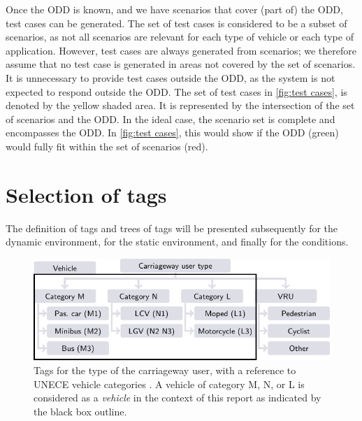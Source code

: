 \documentclass[twoside,twocolumn,9pt]{extarticle}
\theoremstyle{plain}
\begin{document}

Once the ODD is known, and we have scenarios that cover (part of) the ODD, test cases can be generated. The set of test cases is considered to be a subset of scenarios, as not all scenarios are relevant for each type of vehicle or each type of application. However, test cases are always generated from scenarios; we therefore assume that no test case is generated in areas not covered by the set of scenarios. It is unnecessary to provide test cases outside the ODD, as the system is not expected to respond outside the ODD. The set of test cases in \cref{fig:test cases}, is denoted by the yellow shaded area. It is represented by the intersection of the set of scenarios and the ODD. In the ideal case, the scenario set is complete and encompasses the ODD. In \cref{fig:test cases}, this would show if the ODD (green) would fully fit within the set of scenarios (red).



\section{Selection of tags}
\label{sec:tags}

The definition of tags and trees of tags will be presented subsequently for the dynamic environment, for the static environment, and finally for the conditions.

\begin{figure}[t!]
	\centering
	\includegraphics{actor_type}
	\caption{Tags for the type of the carriageway user, with a reference to UNECE vehicle categories \autocite{UNECE2011consolidated}. %
		A vehicle of category M, N, or L is considered as a \emph{vehicle} in the context of this report as indicated by the black box outline. 
	}
	\label{fig:tree carriageway user type}
\end{figure}
\end{document}
